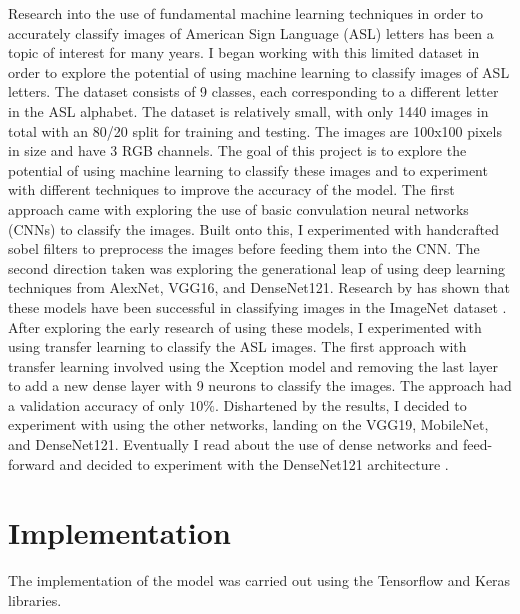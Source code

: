 \documentclass[conference]{IEEEtran}
\begin{document}
Research into the use of fundamental machine learning techniques in order to accurately classify images of American Sign Language (ASL) letters has been a topic of interest for many years. I began working with this limited dataset in order to explore the potential of using machine learning to classify images of ASL letters. The dataset consists of 9 classes, each corresponding to a different letter in the ASL alphabet. The dataset is relatively small, with only 1440 images in total with an 80/20 split for training and testing. The images are 100x100 pixels in size and have 3 RGB channels. The goal of this project is to explore the potential of using machine learning to classify these images and to experiment with different techniques to improve the accuracy of the model. The first approach came with exploring the use of basic convulation neural networks (CNNs) to classify the images. Built onto this, I experimented with handcrafted sobel filters to preprocess the images before feeding them into the CNN. The second direction taken was exploring the generational leap of using deep learning techniques from AlexNet, VGG16, and DenseNet121. Research by has shown that these models have been successful in classifying images in the ImageNet dataset \cite{NIPS2012_c399862d}. After exploring the early research of using these models, I experimented with using transfer learning to classify the ASL images. The first approach with transfer learning involved using the Xception model and removing the last layer to add a new dense layer with 9 neurons to classify the images. The approach had a validation accuracy of only $10\%$. Dishartened by the results, I decided to experiment with using the other networks, landing on the VGG19, MobileNet, and DenseNet121. Eventually I read about the use of dense networks and feed-forward and decided to experiment with the DenseNet121 architecture \cite{DBLP:journals/corr/HuangLW16a}.

\section{Implementation}
The implementation of the model was carried out using the Tensorflow and Keras libraries\cite{tensorflow2015-whitepaper}.
\end{document}
